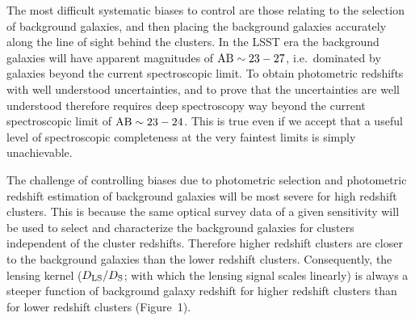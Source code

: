 \documentclass[a4paper,11pt]{article}
\begin{document}
The most difficult systematic biases to control are those relating to
the selection of background galaxies, and then placing the background
galaxies accurately along the line of sight behind the clusters.  In
the LSST era the background galaxies will have apparent magnitudes of
${\rm AB}\sim23-27$, i.e.\ dominated by galaxies beyond the current
spectroscopic limit.  To obtain photometric redshifts with well
understood uncertainties, and to prove that the uncertainties are well
understood therefore requires deep spectroscopy way beyond the current
spectroscopic limit of ${\rm AB}\sim23-24$.  This is true even if we
accept that a useful level of spectroscopic completeness at the very
faintest limits is simply unachievable.

The challenge of controlling biases due to photometric selection and
photometric redshift estimation of background galaxies will be most
severe for high redshift clusters.  This is because the same optical
survey data of a given sensitivity will be used to select and
characterize the background galaxies for clusters independent of the
cluster redshifts.  Therefore higher redshift clusters are closer to
the background galaxies than the lower redshift clusters.
Consequently, the lensing kernel ($D_{\rm LS}/D_{\rm S}$; with which
the lensing signal scales linearly) is always a steeper function of
background galaxy redshift for higher redshift clusters than for lower
redshift clusters (Figure~1).
\end{document}
